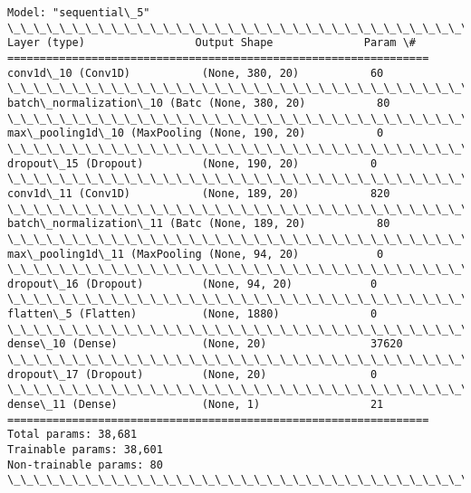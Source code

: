 \documentclass[11pt]{article}
\begin{document}
    \begin{Verbatim}[commandchars=\\\{\}]
Model: "sequential\_5"
\_\_\_\_\_\_\_\_\_\_\_\_\_\_\_\_\_\_\_\_\_\_\_\_\_\_\_\_\_\_\_\_\_\_\_\_\_\_\_\_\_\_\_\_\_\_\_\_\_\_\_\_\_\_\_\_\_\_\_\_\_\_\_\_\_
Layer (type)                 Output Shape              Param \#
=================================================================
conv1d\_10 (Conv1D)           (None, 380, 20)           60
\_\_\_\_\_\_\_\_\_\_\_\_\_\_\_\_\_\_\_\_\_\_\_\_\_\_\_\_\_\_\_\_\_\_\_\_\_\_\_\_\_\_\_\_\_\_\_\_\_\_\_\_\_\_\_\_\_\_\_\_\_\_\_\_\_
batch\_normalization\_10 (Batc (None, 380, 20)           80
\_\_\_\_\_\_\_\_\_\_\_\_\_\_\_\_\_\_\_\_\_\_\_\_\_\_\_\_\_\_\_\_\_\_\_\_\_\_\_\_\_\_\_\_\_\_\_\_\_\_\_\_\_\_\_\_\_\_\_\_\_\_\_\_\_
max\_pooling1d\_10 (MaxPooling (None, 190, 20)           0
\_\_\_\_\_\_\_\_\_\_\_\_\_\_\_\_\_\_\_\_\_\_\_\_\_\_\_\_\_\_\_\_\_\_\_\_\_\_\_\_\_\_\_\_\_\_\_\_\_\_\_\_\_\_\_\_\_\_\_\_\_\_\_\_\_
dropout\_15 (Dropout)         (None, 190, 20)           0
\_\_\_\_\_\_\_\_\_\_\_\_\_\_\_\_\_\_\_\_\_\_\_\_\_\_\_\_\_\_\_\_\_\_\_\_\_\_\_\_\_\_\_\_\_\_\_\_\_\_\_\_\_\_\_\_\_\_\_\_\_\_\_\_\_
conv1d\_11 (Conv1D)           (None, 189, 20)           820
\_\_\_\_\_\_\_\_\_\_\_\_\_\_\_\_\_\_\_\_\_\_\_\_\_\_\_\_\_\_\_\_\_\_\_\_\_\_\_\_\_\_\_\_\_\_\_\_\_\_\_\_\_\_\_\_\_\_\_\_\_\_\_\_\_
batch\_normalization\_11 (Batc (None, 189, 20)           80
\_\_\_\_\_\_\_\_\_\_\_\_\_\_\_\_\_\_\_\_\_\_\_\_\_\_\_\_\_\_\_\_\_\_\_\_\_\_\_\_\_\_\_\_\_\_\_\_\_\_\_\_\_\_\_\_\_\_\_\_\_\_\_\_\_
max\_pooling1d\_11 (MaxPooling (None, 94, 20)            0
\_\_\_\_\_\_\_\_\_\_\_\_\_\_\_\_\_\_\_\_\_\_\_\_\_\_\_\_\_\_\_\_\_\_\_\_\_\_\_\_\_\_\_\_\_\_\_\_\_\_\_\_\_\_\_\_\_\_\_\_\_\_\_\_\_
dropout\_16 (Dropout)         (None, 94, 20)            0
\_\_\_\_\_\_\_\_\_\_\_\_\_\_\_\_\_\_\_\_\_\_\_\_\_\_\_\_\_\_\_\_\_\_\_\_\_\_\_\_\_\_\_\_\_\_\_\_\_\_\_\_\_\_\_\_\_\_\_\_\_\_\_\_\_
flatten\_5 (Flatten)          (None, 1880)              0
\_\_\_\_\_\_\_\_\_\_\_\_\_\_\_\_\_\_\_\_\_\_\_\_\_\_\_\_\_\_\_\_\_\_\_\_\_\_\_\_\_\_\_\_\_\_\_\_\_\_\_\_\_\_\_\_\_\_\_\_\_\_\_\_\_
dense\_10 (Dense)             (None, 20)                37620
\_\_\_\_\_\_\_\_\_\_\_\_\_\_\_\_\_\_\_\_\_\_\_\_\_\_\_\_\_\_\_\_\_\_\_\_\_\_\_\_\_\_\_\_\_\_\_\_\_\_\_\_\_\_\_\_\_\_\_\_\_\_\_\_\_
dropout\_17 (Dropout)         (None, 20)                0
\_\_\_\_\_\_\_\_\_\_\_\_\_\_\_\_\_\_\_\_\_\_\_\_\_\_\_\_\_\_\_\_\_\_\_\_\_\_\_\_\_\_\_\_\_\_\_\_\_\_\_\_\_\_\_\_\_\_\_\_\_\_\_\_\_
dense\_11 (Dense)             (None, 1)                 21
=================================================================
Total params: 38,681
Trainable params: 38,601
Non-trainable params: 80
\_\_\_\_\_\_\_\_\_\_\_\_\_\_\_\_\_\_\_\_\_\_\_\_\_\_\_\_\_\_\_\_\_\_\_\_\_\_\_\_\_\_\_\_\_\_\_\_\_\_\_\_\_\_\_\_\_\_\_\_\_\_\_\_\_
    \end{Verbatim}
\end{document}
